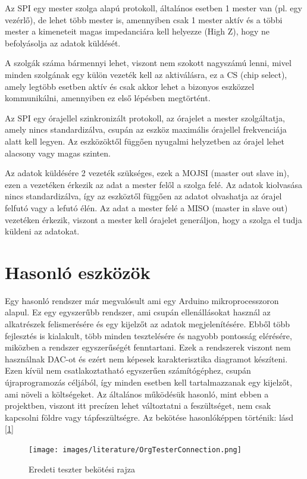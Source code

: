 Az SPI egy mester szolga alapú protokoll, általános esetben 1 mester van (pl. egy 
vezérlő), de lehet több mester is, amennyiben csak 1 mester aktív és a többi mester
a kimeneteit magas impedanciára kell helyezze (High Z), hogy ne befolyásolja az 
adatok küldését. 


A szolgák száma bármennyi lehet, viszont nem szokott nagyszámú lenni, mivel minden
szolgának egy külön vezeték kell az aktiválásra, ez a CS (chip select), amely 
legtöbb esetben aktív és csak akkor lehet a bizonyos eszközzel kommunikálni, amennyiben
ez első lépésben megtörtént.

Az SPI egy órajellel szinkronizált protokoll, az órajelet a mester szolgáltatja,
amely nincs standardizálva, csupán az eszköz maximális órajellel frekvenciája 
alatt kell legyen. Az eszközöktől függően nyugalmi helyzetben az órajel lehet alacsony
vagy magas szinten.

Az adatok küldésére 2 vezeték szükséges, ezek a MOJSI (master out slave in), ezen a
vezetéken érkezik az adat a mester felől a szolga felé. Az adatok kiolvasása nincs
standardizálva, így az eszköztől függően az adatot olvashatja az órajel felfutó vagy a 
lefutó élén. Az adat a mester felé a MISO (master in slave out) vezetéken érkezik,
viszont a mester kell órajelet generáljon, hogy a szolga el tudja küldeni az adatokat.

\section{Hasonló eszközök}

Egy hasonló rendszer már megvalósult \cite{similarSystem} ami egy Arduino 
\cite{ArduinoAtmega}
mikroprocesszoron alapul. Ez egy egyszerűbb rendszer, ami csupán ellenállásokat használ az 
alkatrészek felismerésére és egy kijelzőt az adatok megjelenítésére. Ebből több fejlesztés is 
kialakult, több minden tesztelésére és nagyobb pontosság elérésére, miközben a rendszer 
egyszerűségét fenntartani. Ezek a rendszerek viszont nem használnak DAC-ot és ezért nem képesek 
karakterisztika diagramot készíteni. Ezen kívül nem csatlakoztatható egyszerűen számítógéphez, 
csupán újraprogramozás céljából, így minden esetben kell tartalmazzanak egy kijelzőt, ami 
növeli a költségeket. Az általános működésük hasonló, mint ebben a projektben, viszont itt 
precízen lehet változtatni a feszültséget, nem csak kapcsolni földre vagy tápfeszültségre.
Az bekötése hasonlóképpen történik: lásd [\ref{fig:basicTesterConnection}]

\begin{figure}[h]
    \centering
    \texttt{[image: images/literature/OrgTesterConnection.png]}
    \caption{Eredeti teszter bekötési rajza}
    \label{fig:basicTesterConnection}
\end{figure}


